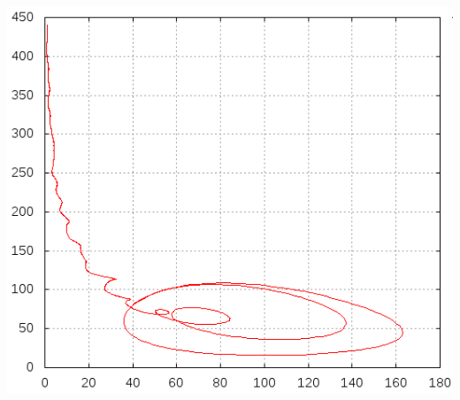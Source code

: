 \documentclass[11pt]{article}
\begin{document}
\begin{minipage}[b]{0.58\textwidth}
\includegraphics[width=\textwidth]{Graphiken/ppm42ham.png}
\end{minipage}
\end{document}
